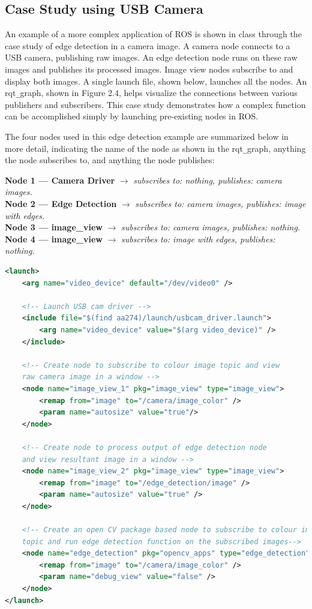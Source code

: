 \documentclass[twoside]{article}
\begin{document}
\subsection{Case Study using USB Camera}
An example of a more complex application of ROS is shown in class through the case study of edge detection in a camera image. A camera node connects to a USB camera, publishing raw images. An edge detection node runs on these raw images and publishes its processed images. Image view nodes subscribe to and display both images. A single launch file, shown below, launches all the nodes. An rqt\verb|_|graph, shown in Figure 2.4, helps visualize the connections between various publishers and subscribers. This case study demonstrates how a complex function can be accomplished simply by launching pre-existing nodes in ROS.

The four nodes used in this edge detection example are summarized below in more detail, indicating the name of the node as shown in the rqt\verb|_|graph, anything the node subscribes to, and anything the node publishes:

\textbf{Node 1 --– Camera Driver} $\rightarrow$ \textit{subscribes to: nothing, publishes: camera images.}
\\
\textbf{Node 2 --– Edge Detection} $\rightarrow$ \textit{subscribes to: camera images, publishes: image with edges.}
\\
\textbf{Node 3 --– image\_view} $\rightarrow$ \textit{subscribes to: camera images, publishes: nothing.}
\\
\textbf{Node 4 --– image\_view} $\rightarrow$ \textit{subscribes to: image with edges, publishes: nothing.}



\begin{lstlisting}[language=XML]
<launch>
    <arg name="video_device" default="/dev/video0" />
   
    <!-- Launch USB cam driver -->
    <include file="$(find aa274)/launch/usbcam_driver.launch">
        <arg name="video_device" value="$(arg video_device)" />
    </include>
   
    <!-- Create node to subscribe to colour image topic and view
    raw camera image in a window -->
    <node name="image_view_1" pkg="image_view" type="image_view">
        <remap from="image" to="/camera/image_color" />
        <param name="autosize" value="true"/>
    </node>
    
    <!-- Create node to process output of edge detection node
    and view resultant image in a window -->
    <node name="image_view_2" pkg="image_view" type="image_view">
        <remap from="image" to="/edge_detection/image" />
        <param name="autosize" value="true" />
    </node>

    <!-- Create an open CV package based node to subscribe to colour image
    topic and run edge detection function on the subscribed images-->
    <node name="edge_detection" pkg="opencv_apps" type="edge_detection">
        <remap from="image" to="/camera/image_color" />
        <param name="debug_view" value="false" />
    </node>
</launch>
\end{lstlisting}
\end{document}

